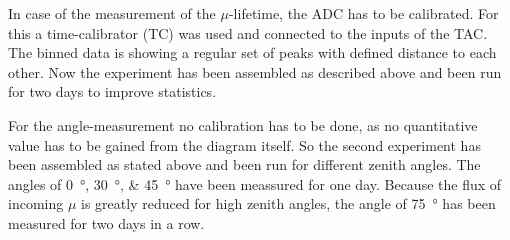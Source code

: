 	In case of the measurement of the $\mu$-lifetime, the ADC has to be calibrated.
	For this a time-calibrator (TC) was used and connected to the inputs of the TAC.
	The binned data is showing a regular set of peaks with defined distance to each other.
	Now the experiment has been assembled as described above and been run for two days to improve statistics.
	
	For the angle-measurement no calibration has to be done, as no quantitative value has to be gained from the diagram itself.
	So the second experiment has been assembled as stated above and been run for different zenith angles.
	The angles of \SIlist{0;30;45}{\degree} have been meassured for one day.
	Because the flux of incoming $\mu$ is greatly reduced for high zenith angles, the angle of \SI{75}{\degree} has been measured for two days in a row.
	

%

